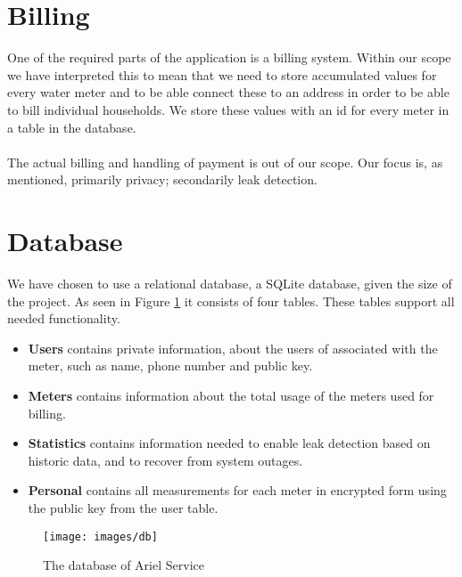 \section{Billing}
One of the required parts of the application is a billing system. Within our scope we have interpreted this to mean that we need to store accumulated values for every water meter and to be able connect these to an address in order to be able to bill individual households. We store these values with an id for every meter in a table in the database.\\
\\
The actual billing and handling of payment is out of our scope. Our focus is, as mentioned, primarily privacy; secondarily leak detection.

\section{Database}
We have chosen to use a relational database, a SQLite database, given the size of the project. As seen in Figure \ref{fig:db} it consists of four tables. These tables support all needed functionality. 
\begin{itemize}
	\item \textbf{Users} contains private information, about the users of associated with the meter, such as name, phone number and public key. 
	\item \textbf{Meters} contains information about the total usage of the meters used for billing.
	\item \textbf{Statistics} contains information needed to enable leak detection based on historic data, and to recover from system outages. 
	\item \textbf{Personal} contains all measurements for each meter in encrypted form using the public key from the user table. 
\end{itemize}

 \begin{figure}[H]
 	\label{fig:db}
 	\centering
 	\texttt{[image: images/db]} 
 	\caption{The database of Ariel Service}
 \end{figure}

